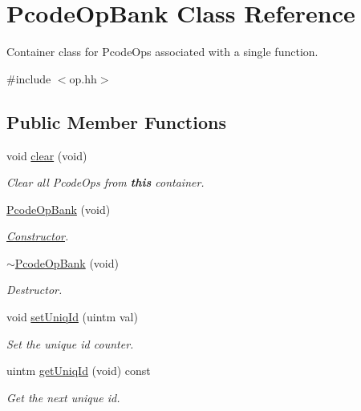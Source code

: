 \hypertarget{class_pcode_op_bank}{}\section{Pcode\+Op\+Bank Class Reference}
\label{class_pcode_op_bank}


Container class for Pcode\+Ops associated with a single function.  




{\ttfamily \#include $<$op.\+hh$>$}

\subsection*{Public Member Functions}
\begin{DoxyCompactItemize}
\item 
void \mbox{\hyperlink{class_pcode_op_bank_a75aac7c9c8c0c73002fbd6352e41f67b}{clear}} (void)
\begin{DoxyCompactList}\small\item\em Clear all Pcode\+Ops from {\bfseries{this}} container. \end{DoxyCompactList}\item 
\mbox{\hyperlink{class_pcode_op_bank_ab5d777cf16d8e0d730a189b22ef0817c}{Pcode\+Op\+Bank}} (void)
\begin{DoxyCompactList}\small\item\em \mbox{\hyperlink{class_constructor}{Constructor}}. \end{DoxyCompactList}\item 
\mbox{\hyperlink{class_pcode_op_bank_af8613c0a59c2de072acc830f3b24b8e9}{$\sim$\+Pcode\+Op\+Bank}} (void)
\begin{DoxyCompactList}\small\item\em Destructor. \end{DoxyCompactList}\item 
void \mbox{\hyperlink{class_pcode_op_bank_a598db9267369f9dbe7d044ac3dbb03e9}{set\+Uniq\+Id}} (uintm val)
\begin{DoxyCompactList}\small\item\em Set the unique id counter. \end{DoxyCompactList}\item 
uintm \mbox{\hyperlink{class_pcode_op_bank_a54e8b50b4b4c2fa1e4c4aa80d3cd6588}{get\+Uniq\+Id}} (void) const
\begin{DoxyCompactList}\small\item\em Get the next unique id. \end{DoxyCompactList}\item 

\end{DoxyCompactItemize}
